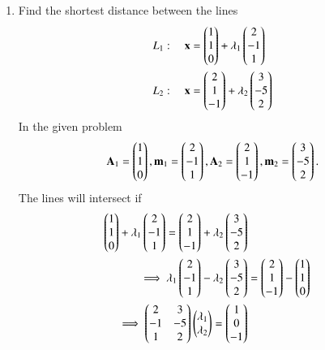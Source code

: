 \begin{enumerate}[label=\arabic*.,ref=\thesubsection.\theenumi]
\item Find the shortest distance between the lines 
\begin{align}
L_1: \quad \mathbf{x} &= \begin{pmatrix}1\\1\\0\end{pmatrix} + \lambda_1\begin{pmatrix}2 \\ -1 \\1\end{pmatrix}
\\
L_2: \quad \mathbf{x} &= \begin{pmatrix}2\\1\\-1\end{pmatrix} + \lambda_2\begin{pmatrix}3 \\ -5 \\2\end{pmatrix}
\end{align}
\label{prob:line_dist_skew}
%
\solution  In the given  problem
\begin{align}
\mathbf{A}_1= \begin{pmatrix}1\\1\\0\end{pmatrix}, \mathbf{m}_1=\begin{pmatrix}2 \\ -1 \\1\end{pmatrix},
\mathbf{A}_2= \begin{pmatrix}2\\1\\-1\end{pmatrix}, \mathbf{m}_2 =\begin{pmatrix}3 \\ -5 \\2\end{pmatrix}.
\end{align}
%
The lines will intersect if
%
\begin{align}
\myvec{1\\1\\0} + \lambda_1\myvec{2 \\ -1 \\1}
= \myvec{2\\1\\-1} + \lambda_2\myvec{3 \\ -5 \\2}
\\
\implies \lambda_1\myvec{2 \\ -1 \\1} - \lambda_2\myvec{3 \\ -5 \\2} &= \myvec{2\\1\\-1}-\myvec{1\\1\\0}  
\\
\implies \myvec{2 & 3 \\ -1 & -5 \\ 1 & 2}\myvec{\lambda_1\\ \lambda_2} = \myvec{1\\0\\-1}

\end{align}
\end{enumerate}
